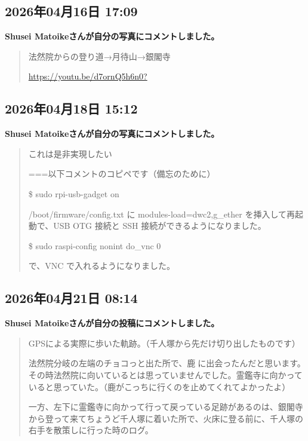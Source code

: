 \subsection*{2026年04月16日 17:09}

\textbf{Shusei Matoikeさんが自分の写真にコメントしました。}

\begin{quote}
法然院からの登り道→月待山→銀閣寺

\url{https://youtu.be/d7ornQ5h6n0?}
\end{quote}

\subsection*{2026年04月18日 15:12}

\textbf{Shusei Matoikeさんが自分の写真にコメントしました。}

\begin{quote}
これは是非実現したい

===以下コメントのコピペです（備忘のために）

\$ sudo rpi-usb-gadget on

/boot/firmware/config.txt に modules-load=dwc2,g\_ether を挿入して再起動で、USB OTG 接続と SSH 接続ができるようになりました。

\$ sudo raspi-config nonint do\_vnc 0

で、VNC で入れるようになりました。
\end{quote}

\subsection*{2026年04月21日 08:14}

\textbf{Shusei Matoikeさんが自分の投稿にコメントしました。}

\begin{quote}
GPSによる実際に歩いた軌跡。（千人塚から先だけ切り出したものです）

法然院分岐の左端のチョコっと出た所で、鹿🦌に出会ったんだと思います。その時法然院に向いているとは思っていませんでした。霊鑑寺に向かっていると思っていた。（鹿がこっちに行くのを止めてくれてよかったよ）

一方、左下に霊鑑寺に向かって行って戻っている足跡があるのは、銀閣寺から登って来てちょうど千人塚に着いた所で、火床に登る前に、千人塚の右手を散策しに行った時のログ。
\end{quote}

